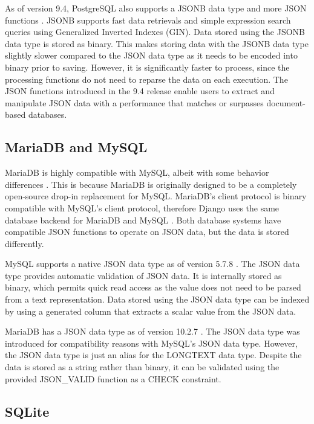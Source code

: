 As of version 9.4, PostgreSQL also supports a JSONB data type and more JSON
functions \cite{postgresql:9.4}. JSONB supports fast data retrievals and simple
expression search queries using Generalized Inverted Indexes (GIN). Data stored
using the JSONB data type is stored as binary. This makes storing data with the
JSONB data type slightly slower compared to the JSON data type as it needs to
be encoded into binary prior to saving. However, it is significantly faster to
process, since the processing functions do not need to reparse the data on each
execution. The JSON functions introduced in the 9.4 release enable users to
extract and manipulate JSON data with a performance that matches or surpasses
document-based databases.

\subsection{MariaDB and MySQL}

MariaDB is highly compatible with MySQL, albeit with some behavior differences
\cite{mariadb:compatibility}. This is because MariaDB is originally designed to
be a completely open-source drop-in replacement for MySQL. MariaDB's client
protocol is binary compatible with MySQL's client protocol, therefore Django
uses the same database backend for MariaDB and MySQL \cite{django:databases}.
Both database systems have compatible JSON functions to operate on JSON data,
but the data is stored differently.

MySQL supports a native JSON data type as of version 5.7.8 \cite{mysql:json}.
The JSON data type provides automatic validation of JSON data. It is internally
stored as binary, which permits quick read access as the value does not need to
be parsed from a text representation. Data stored using the JSON data type can
be indexed by using a generated column that extracts a scalar value from the
JSON data.

MariaDB has a JSON data type as of version 10.2.7 \cite{mariadb:json}. The JSON
data type was introduced for compatibility reasons with MySQL's JSON data type.
However, the JSON data type is just an alias for the LONGTEXT data type.
Despite the data is stored as a string rather than binary, it can be validated
using the provided JSON\_VALID function as a CHECK constraint.

\subsection{SQLite}

